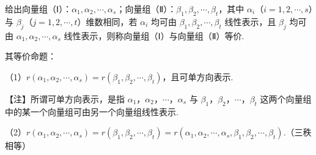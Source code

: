 

给出向量组（Ⅰ）：$\alpha_1,\alpha_2,\cdots,\alpha_s$；向量组（Ⅱ）：$\beta_1,\beta_2,\cdots,\beta_t$，其中 $\alpha_i$（$i=1,2,\cdots,s$）与 $\beta_j$（$j=1,2,\cdots,t$）维数相同，若 $\alpha_i$ 均可由 $\beta_1,\beta_2,\cdots,\beta_t$ 线性表示，且 $\beta_j$ 均可由 $\alpha_1,\alpha_2,\cdots,\alpha_s$ 线性表示，则称向量组（Ⅰ）与向量组（Ⅱ）等价.

其等价命题：

（1）$r(\alpha_1,\alpha_2,\cdots,\alpha_s)=r(\beta_1,\beta_2,\cdots,\beta_t)$，且可单方向表示.

\begin{fnote}
【注】所谓可单方向表示，是指 $\alpha_1$，$\alpha_2$，$\cdots$，$\alpha_s$ 与 $\beta_1$，$\beta_2$，$\cdots$，$\beta_t$ 这两个向量组中的某一个向量组可由另一个向量组线性表示.
\end{fnote}

（2）$r(\alpha_1,\alpha_2,\cdots,\alpha_s)=r(\beta_1,\beta_2,\cdots,\beta_t)=r(\alpha_1,\alpha_2,\cdots,\alpha_s,\beta_1,\beta_2,\cdots,\beta_t)$.（三秩相等）


